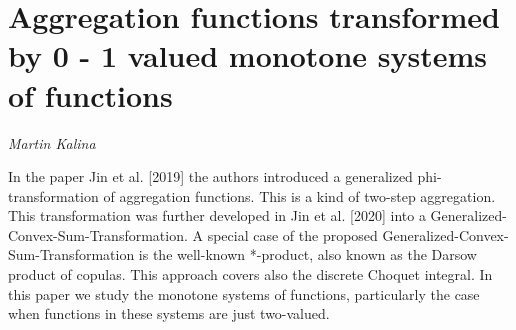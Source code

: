 \documentclass[../booklet.tex]{subfiles}
\begin{document}
\section[Aggregation functions transformed by 0 - 1 valued monotone systems of  functions. {\it Martin Kalina}]{Aggregation functions transformed by 0 - 1 valued monotone systems of  functions}

\begin{center}
  {\it Martin Kalina}
\end{center}

\vskip 0.8cm


In the paper  Jin et al. [2019] the authors introduced a generalized phi-transformation of aggregation functions. This is a kind of two-step aggregation. This transformation was further developed in  Jin et al. [2020] into a Generalized-Convex-Sum-Transformation. A special case of the proposed  Generalized-Convex-Sum-Transformation is the well-known *-product, also known as the Darsow product of copulas. This approach covers also the discrete Choquet integral. In this paper we  study the monotone systems of functions, particularly the case when functions in these systems are just two-valued.

	
\end{document}

